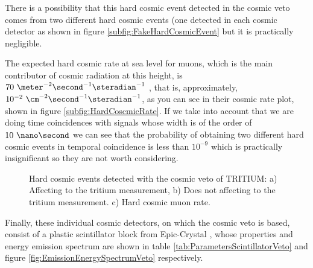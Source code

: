 There is a possibility that this hard cosmic event detected in the cosmic veto comes from two different hard cosmic events (one detected in each cosmic detector as shown in figure \ref{subfig:FakeHardCosmicEvent} but it is practically negligible.

The expected hard cosmic rate at sea level for muons, which is the main contributor of cosmic radiation at this height, is $70~\meter^{-2}\second^{-1}\steradian^{-1}$ \cite{PDG}\cite{HardCosmicMuonRate}, that is, approximately, $10^{-2}~\cm^{-2}\second^{-1}\steradian^{-1}$, as you can see in their cosmic rate plot, shown in figure \ref{subfig:HardCoscmicRate}. If we take into account that we are doing time coincidences with signals whose width is of the order of $10~\nano\second$ we can see that the probability of obtaining two different hard cosmic events in temporal coincidence is less than $10^{-9}$ which is practically insignificant so they are not worth considering.

\begin{figure}[h]
 \centering
 \caption{Hard cosmic events detected with the cosmic veto of TRITIUM: a) Affecting to the tritium measurement, b) Does not affecting to the tritium measurement. c) Hard cosmic muon rate. }
 \label{fig:HardCosmicEventsSimulation}
\end{figure}

Finally, these individual cosmic detectors, on which the cosmic veto is based, consist of a plastic scintillator block from Epic-Crystal \cite{ScintillatorVeto}, whose properties and energy emission spectrum are shown in table \ref{tab:ParametersScintillatorVeto} and figure \ref{fig:EmissionEnergySpectrumVeto} respectively.

